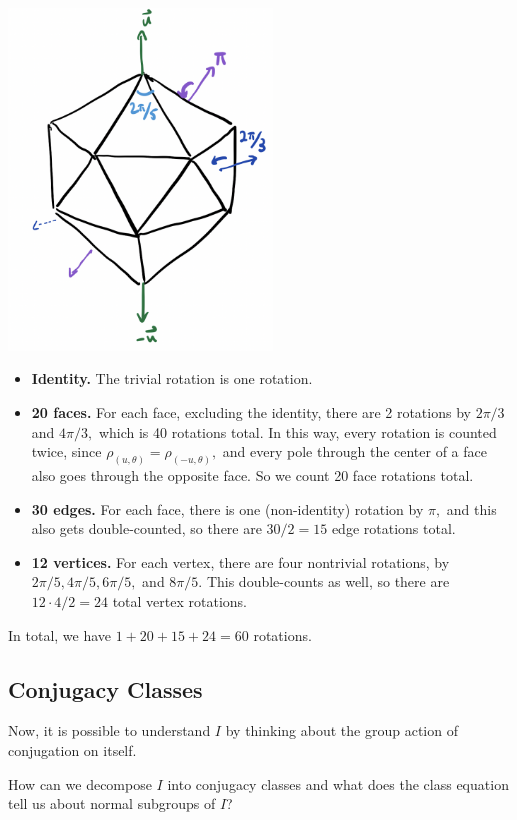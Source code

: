 \begin{center}
    \includegraphics[width=7cm]{Lecture Files and Images/lec20-icos.png}
\end{center}

\begin{itemize}
    \item \textbf{Identity.} The trivial rotation is one rotation. 
    \item \textbf{20 faces.} For each face, excluding the identity, there are 2 rotations by $2\pi/3$ and $4\pi/3,$ which is 40 rotations total. In this way, every rotation is counted twice, since $\rho_{(u, \theta)} = \rho_{(-u, \theta)},$ 
    and every pole through the center of a face also goes through the opposite face. So we count 20 face rotations total.
    
    \item \textbf{30 edges.} For each face, there is one (non-identity) rotation by $\pi,$ and this also gets double-counted, so there are $30/2 = 15$ edge rotations total. 
    
    \item \textbf{12 vertices.} For each vertex, there are four nontrivial rotations, by $2\pi/5, 4\pi/5, 6\pi/5,$ and $8\pi/5.$ This double-counts as well, so there are $12 \cdot 4 / 2 = 24$ total vertex rotations.
\end{itemize}

In total, we have $1 + 20 + 15 + 24 = 60$ rotations. 
\subsection{Conjugacy Classes}

Now, it is possible to understand $I$ by thinking about the group action of conjugation on itself.
\begin{qq}
How can we decompose $I$ into conjugacy classes and what does the class equation tell us about normal subgroups of $I$? 
\end{qq}

